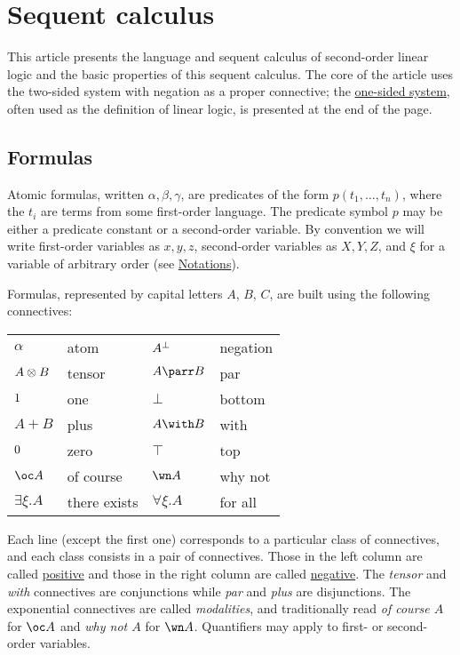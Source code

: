 \chapter{Sequent calculus}\label{sequent-calculus}

This article presents the language and sequent calculus of second-order
linear logic and the basic properties of this sequent calculus. The core
of the article uses the two-sided system with negation as a proper
connective; the \hyperref[one-sided-sequent-calculus]{one-sided
system}, often used as the definition of linear logic, is presented at
the end of the page.

\section{Formulas}\label{formulas}

Atomic formulas, written \(\alpha,\beta,\gamma\), are predicates of the
form \(p(t_1,\ldots,t_n)\), where the \(t_i\) are terms from some
first-order language. The predicate symbol \(p\) may be either a
predicate constant or a second-order variable. By convention we will
write first-order variables as \(x,y,z\), second-order variables as
\(X,Y,Z\), and \(\xi\) for a variable of arbitrary order (see
\url{Notations}).

Formulas, represented by capital letters \(A\), \(B\), \(C\), are built
using the following connectives:

\begin{longtable}[]{@{}llll@{}}
\toprule
\(\alpha\) & atom & \(A^\bot\) & negation\tabularnewline
\(A \otimes B\) & tensor & \(A \parr B\) & par\tabularnewline
\(1\) & one & \(\bot\) & bottom\tabularnewline
\(A \plus B\) & plus & \(A \with B\) & with\tabularnewline
\(0\) & zero & \(\top\) & top\tabularnewline
\(\oc A\) & of course & \(\wn A\) & why not\tabularnewline
\(\exists \xi.A\) & there exists & \(\forall \xi.A\) & for
all\tabularnewline
\bottomrule
\end{longtable}

Each line (except the first one) corresponds to a particular class of
connectives, and each class consists in a pair of connectives. Those in
the left column are called \href{positive_formula}{positive} and those
in the right column are called \href{negative_formula}{negative}. The
\emph{tensor} and \emph{with} connectives are conjunctions while
\emph{par} and \emph{plus} are disjunctions. The exponential connectives
are called \emph{modalities}, and traditionally read \emph{of course
\(A\)} for \(\oc A\) and \emph{why not \(A\)} for \(\wn A\). Quantifiers
may apply to first- or second-order variables.


